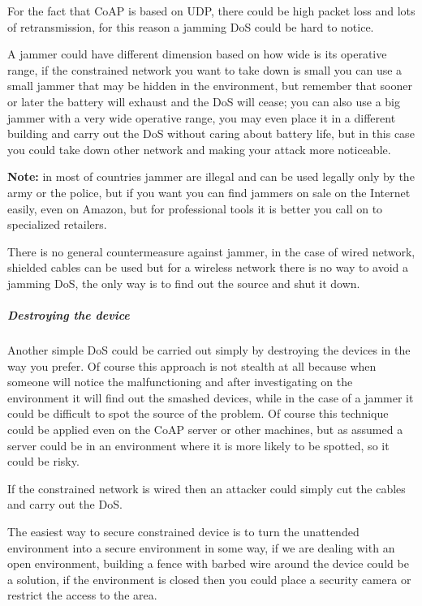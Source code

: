 	For the fact that CoAP is based on UDP, there could be high packet loss and lots of retransmission, for this reason a jamming DoS could be hard to notice.\newline
	
	A jammer could have different dimension based on how wide is its operative range, if the constrained network you want to take down is small you can use a small jammer that may be hidden in the environment, but remember that sooner or later the battery will exhaust and the DoS will cease; you can also use a big jammer with a very wide operative range, you may even place it in a different building and carry out the DoS without caring about battery life, but in this case you could take down other network and making your attack more noticeable.\newline
	
	\textbf{Note:} in most of countries jammer are illegal and can be used legally only by the army or the police, but if you want you can find jammers on sale on the Internet easily, even on Amazon, but for professional tools it is better you call on to specialized retailers.\newline
	
	There is no general countermeasure against jammer, in the case of wired network, shielded cables can be used but for a wireless network there is no way to avoid a jamming DoS, the only way is to find out the source and shut it down.\newline
	
	\subparagraph{Destroying the device}
	Another simple DoS could be carried out simply by destroying the devices in the way you prefer.\newline
	Of course this approach is not stealth at all because when someone will notice the malfunctioning and after investigating on the environment it will find out the smashed devices, while in the case of a jammer it could be difficult to spot the source of the problem.\newline
	Of course this technique could be applied even on the CoAP server or other machines, but as assumed a server could be in an environment where it is more likely to be spotted, so it could be risky.\newline
	
	If the constrained network is wired then an attacker could simply cut the cables and carry out the DoS.\newline
	
	The easiest way to secure constrained device is to turn the unattended environment into a secure environment in some way, if we are dealing with an open environment, building a fence with barbed wire around the device could be a solution, if the environment is closed then you could place a security camera or restrict the access to the area.\newline
	
